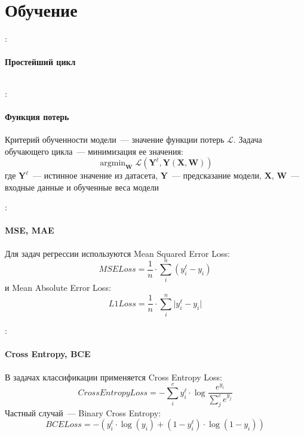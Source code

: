 \documentclass{beamer}
\DeclareMathOperator*{\argmin}{argmin}
\newcommand{\mtx}[1]{\boldsymbol{#1}}
\newcommand{\Loss}{\mathcal{L}}
\begin{document}
\section{Обучение}

\begin{frame}{\secname : \subsecname}
  \framesubtitle{Простейший цикл}


  \inputminted[firstline=42,lastline=50]{python}{linear_regression_1/linear_regression_1.py}
\end{frame}

\begin{frame}{\secname : \subsecname}
  \framesubtitle{Функция потерь}
  Критерий обученности модели~--- значение функции потерь $\Loss$.
  Задача обучающего цикла~--- минимизация ее значения:
  $$
  \argmin_{\mtx{W}}\Loss\left(\mtx{Y}^{\ell},\mtx{Y}\left(\mtx{X},\mtx{W}\right)\right)
  $$
  где $\mtx{Y}^{\ell}$~--- истинное значение из датасета,
  $\mtx{Y}$~--- предсказание модели, $\mtx{X}$, $\mtx{W}$~--- входные
  данные и обученные веса модели
\end{frame}

\begin{frame}{\secname : \subsecname}
  \framesubtitle{MSE, MAE}
  Для задач регрессии используются Mean Squared Error Loss:
  $$
  MSELoss = \frac{1}{n}\cdot\sum_{i}^{n}\left(y^{\ell}_i - y_i\right)
  $$
  и Mean Absolute Error Loss:
  $$
  L1Loss = \frac{1}{n} \cdot \sum_{i}^{n}\lvert y^{\ell}_i - y_i\rvert
  $$
\end{frame}

\begin{frame}{\secname : \subsecname}
  \framesubtitle{Cross Entropy, BCE}


  В задачах классификации применяется Cross Entropy Loss:
  $$
  CrossEntropyLoss = -\sum_{i}^{c} y^{\ell}_i \cdot \log\frac{e^{y_{i}}}{
  \sum_{j}^{c} e^{y_{j}}}
  $$
  Частный случай~--- Binary Cross Entropy:
  $$
  BCELoss = -\left( y^{\ell}_i \cdot \log \left( y_i \right) + \left(
  1-y^{\ell}_i \right) \cdot \log \left(1 - y_i \right) \right)
  $$
\end{frame}
\end{document}
